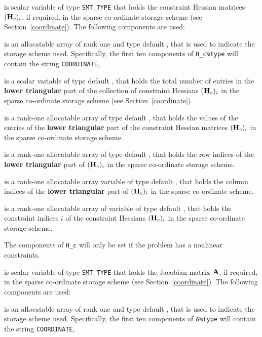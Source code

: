\documentclass{galahad}
\begin{document}
\begin{description}
 is scalar variable of type {\tt SMT\_TYPE}
that holds the constraint Hessian matrices $({\mathbf{H}}_c)_i$, if required,
in the sparse co-ordinate storage scheme (see Section~\ref{coordinate}).
The following components are used:

\begin{description}

 is an allocatable array of rank one and type default
\character, that is used to indicate the storage scheme used. Specifically,
the first ten components of {\tt H\_c\%type} will contain the
string {\tt COORDINATE},

 is a scalar variable of type default \integer, that
holds the total number of entries in the {\bf lower triangular} part of 
the collection of constraint Hessians $({\mathbf{H}}_c)_i$
in the sparse co-ordinate storage scheme (see Section~\ref{coordinate}).

 is a rank-one allocatable array of type default \realdp, that
holds the values of the entries of the {\bf lower triangular} part
of the constraint Hessian matrices $({\mathbf{H}}_c)_i$ 
in the sparse co-ordinate storage scheme.

 is a rank-one allocatable array of type default \integer,
that holds the row indices of the {\bf lower triangular} part of 
$({\mathbf{H}}_c)_i$ in the sparse co-ordinate storage scheme.

 is a rank-one allocatable array variable of type default
\integer, that holds the column indices of the {\bf lower triangular} part of
$({\mathbf{H}}_c)_i$ in the sparse co-ordinate scheme.

 is a rank-one allocatable array of variable of type
default \integer, that holds the constraint indices $i$
of the constraint Hessians $({\mathbf{H}}_c)_i$
in the sparse co-ordinate storage scheme.
\end{description}

The components of {\tt H\_c} will only be set if the problem has a
nonlinear constraints.

 is scalar variable of type {\tt SMT\_TYPE}
that holds the Jacobian matrix ${\mathbf{A}}$, if required,
in the sparse co-ordinate storage scheme (see Section~\ref{coordinate}).
The following components are used:

\begin{description}

 is an allocatable array of rank one and type default \character,
that is used to indicate the storage scheme used. Specifically,
the first ten components of {\tt A\%type} will contain the
string {\tt COORDINATE},


\end{description}
\end{description}
\end{document}
